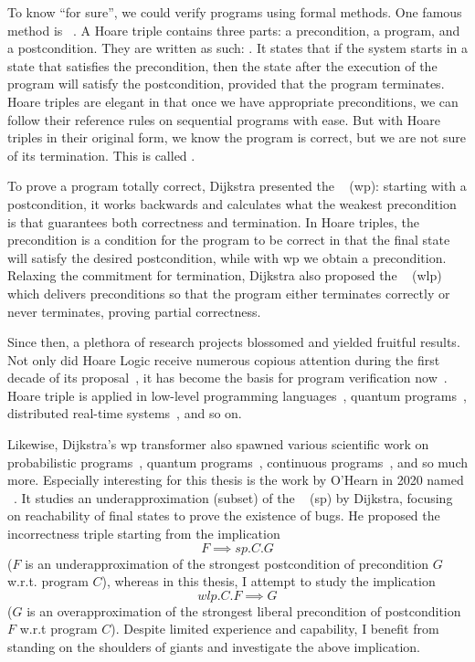 To know ``for sure'', we could verify programs using formal methods. 
One famous method is ~\cite{hoare69}. 
A Hoare triple contains three parts: a precondition, a program, and a postcondition. 
They are written as such: .
It states that if the system starts in a state that satisfies the precondition, then the state after the execution of the program will satisfy the postcondition, provided that the program terminates.
Hoare triples are elegant in that once we have appropriate preconditions, we can follow their reference rules on sequential programs with ease. 
But with Hoare triples in their original form, we know the program is correct, but we are not sure of its termination. 
This is called . 

To prove a program totally correct, Dijkstra presented the ~\cite{dijkstra75} (wp): starting with a postcondition, it works backwards and calculates what the weakest precondition is that guarantees both correctness and termination. 
In Hoare triples, the precondition is a  condition for the program to be correct in that the final state will satisfy the desired postcondition, while with wp we obtain a  precondition. 
Relaxing the commitment for termination, Dijkstra also proposed the ~\cite{dijkstra90} (wlp) which delivers preconditions so that the program either terminates correctly or never terminates, proving partial correctness. 

Since then, a plethora of research projects blossomed and yielded fruitful results. 
Not only did Hoare Logic receive numerous copious attention during the first decade of its proposal~\cite{apt81}, it has become the basis for program verification now~\cite{gordon2010ForwardHoare}. 
Hoare triple is applied in low-level programming languages~\cite{myreen07}, quantum programs~\cite{zhou19}, distributed real-time systems~\cite{hooman1994extending}, and so on. 

Likewise, Dijkstra's wp transformer also spawned various scientific work on probabilistic programs~\cite{kaminski2016weakest}, quantum programs~\cite{liu22}, continuous programs~\cite{boreale20}, and so much more.
Especially interesting for this thesis is the work by O'Hearn in 2020 named ~\cite{ohearn2020IncorrectnessLogic}. 
It studies an underapproximation (subset) of the ~\cite{dijkstra90} (sp) by Dijkstra, focusing on reachability of final states to prove the existence of bugs. 
He proposed the incorrectness triple starting from the implication 
$$F\implies sp.C.G$$
($F$ is an underapproximation of the strongest postcondition of precondition $G$ w.r.t. program $C$), whereas in this thesis, I attempt to study the implication 
$$wlp.C.F\implies G$$ 
($G$ is an overapproximation of the strongest liberal precondition of postcondition $F$ w.r.t program $C$). 
Despite limited experience and capability, I benefit from standing on the shoulders of giants and investigate the above implication. 


